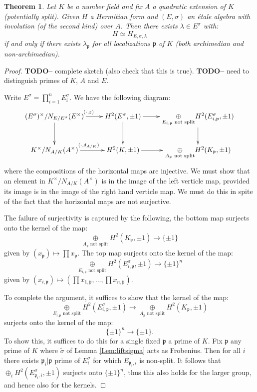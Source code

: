 \documentclass{article}
\theoremstyle{plain}
\newtheorem{theorem}{Theorem}[section]
\theoremstyle{definition}
\numberwithin{equation}{section}
\newcommand{\fp}{\mathfrak{p}}
\newcommand{\TODO}[1]{\textbf{TODO-#1}}
\begin{document}
\begin{theorem}
Let $K$ be a number field and fix $A$ a quadratic extension of $K$ (potentially split).
Given $H$ a Hermitian form and $(E,\sigma)$ an \'etale algebra with involution (of the second kind) over $A$. Then there exists $\lambda \in E^\sigma$ with:
\[ H \simeq H_{E,\sigma,\lambda} \]
if and only if there exists $\lambda_\fp$ for all localizations $\fp$ of $K$ (both archimedian and non-archimedian).
\end{theorem}
\begin{proof}
\TODO - complete sketch (also check that this is true).
\TODO - need to distinguish primes of $K$, $A$ and $E$.

Write $E^\sigma = \prod_{i=1}^n E^\sigma_i$.
We have the following diagram:
\[
\xymatrix{
(E^\sigma)^\times/N_{E/E^\sigma}(E^\times) \ar[r]^{(\cdot,z)} \ar[d]& H^2(E^\sigma, \pm 1) \ar[r] \ar[d]& \underset{E_{i,\fp} \text{ not split}}\oplus H^2(E^\sigma_{i,\fp},\pm 1) \ar[d]\\
K^\times/N_{A/K}(A^\times) \ar[r]^{(\cdot,\delta_{A/K})} & H^2(K, \pm 1) \ar[r] & \underset{A_\fp \text{ not split}}\oplus H^2(K_\fp,\pm 1)
}
\]
where the compositions of the horizontal maps are injective.
We must show that an element in $K^\times/N_{A/K}(A^\times) $ is in the image of the left verticle map, provided its image is in the image of the right hand verticle map.
We must do this in spite of the fact that the horizontal maps are not surjective.

The failure of surjectivity is captured by the following, the bottom map surjects onto the kernel of the map:
\[ \underset{A_\fp \text{ not split}}\oplus H^2(K_\fp,\pm 1)  \rightarrow \{ \pm1\} \]
given by $(x_\fp) \mapsto \prod x_\fp$. The top map surjects onto the kernel of the map:
\[ \underset{E_{i,\fp} \text{ not split}}\oplus H^2(E_{i,\fp}^\sigma,\pm 1)  \rightarrow \{ \pm1\}^n \]
given by $(x_{i,\fp}) \mapsto (\prod x_{1,\fp}, \ldots, \prod x_{n,\fp}) $.

To complete the argument, it suffices to show that the kernel of the map:
\[\underset{E_{i,\fp} \text{ not split}}\oplus H^2(E_{i,\fp}^\sigma,\pm 1)  \rightarrow \underset{A_\fp \text{ not split}}\oplus H^2(K_\fp,\pm 1) \]
surjects onto the kernel of the map:
\[ \{ \pm1\}^n \rightarrow \{ \pm1\}. \]
To show this, it suffices to do this for a single fixed $\fp$ a prime of $K$.
Fix $\fp$ any prime of $K$ where $\tilde{\sigma}$ of Lemma \ref{Lem:liftsigma} acts as Frobenius. Then for all $i$ there exists $\fp_i | \fp$ prime of $E_i^\sigma$ for which $E_{\fp_i,i}$ is non-split. It follows that $\oplus_i H^2(E_{\fp_i,i}^\sigma,\pm1)$ surjects onto $\{\pm 1\}^n$, thus this also holds for the larger group, and hence also for the kernels.
\end{proof}
\end{document}
